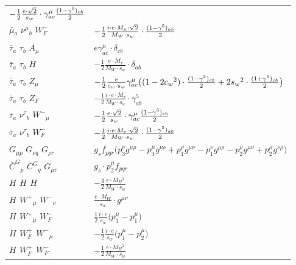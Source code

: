 \begin{center}
\begin{tabular}{|l|l|}
	$-\frac{1}{2}\frac{ e \cdot\sqrt{2}}{ s_w}\cdot \gamma_{a c}^\mu {(1-\gamma^5)_{c b}\over 2} $\\[2mm]
$\bar{\mu}{}_{a }$ \phantom{-} $\nu^\mu{}_{b }$ \phantom{-} $W^-_F{}_{}$ \phantom{-}  &
	$-\frac{1}{2}\frac{ i \cdot e \cdot M_{\mu} \cdot\sqrt{2}}{ M_W \cdot s_w}\cdot {(1-\gamma^5)_{a b}\over 2} $\\[2mm]
$\bar{\tau}{}_{a }$ \phantom{-} $\tau{}_{b }$ \phantom{-} ${A}_{\mu }$ \phantom{-}  &
	$ e\gamma_{a c}^\mu \cdot \delta_{c b} $\\[2mm]
$\bar{\tau}{}_{a }$ \phantom{-} $\tau{}_{b }$ \phantom{-} ${H}_{}$ \phantom{-}  &
	$-\frac{1}{2}\frac{ e \cdot M_{\tau}}{ M_W \cdot s_w}\cdot \delta_{a b} $\\[2mm]
$\bar{\tau}{}_{a }$ \phantom{-} $\tau{}_{b }$ \phantom{-} ${Z}_{\mu }$ \phantom{-}  &
	$-\frac{1}{2}\frac{ e}{ c_w \cdot s_w}\gamma_{a c}^\mu \big( (1-2 c_w {}^2)\cdot {(1-\gamma^5)_{c b}\over 2} +2 s_w{}^2 \cdot {(1+\gamma^5)_{c b}\over 2} \big)$\\[2mm]
$\bar{\tau}{}_{a }$ \phantom{-} $\tau{}_{b }$ \phantom{-} $Z_F{}_{}$ \phantom{-}  &
	$-\frac{1}{2}\frac{ i \cdot e \cdot M_{\tau}}{ M_W \cdot s_w}\cdot \gamma_{a b}^5 $\\[2mm]
$\bar{\tau}{}_{a }$ \phantom{-} $\nu^\tau{}_{b }$ \phantom{-} $W^-{}_{\mu }$ \phantom{-}  &
	$-\frac{1}{2}\frac{ e \cdot\sqrt{2}}{ s_w}\cdot \gamma_{a c}^\mu {(1-\gamma^5)_{c b}\over 2} $\\[2mm]
$\bar{\tau}{}_{a }$ \phantom{-} $\nu^\tau{}_{b }$ \phantom{-} $W^-_F{}_{}$ \phantom{-}  &
	$-\frac{1}{2}\frac{ i \cdot e \cdot M_{\tau} \cdot\sqrt{2}}{ M_W \cdot s_w}\cdot {(1-\gamma^5)_{a b}\over 2} $\\[2mm]
${G}_{\mu p }$ \phantom{-} ${G}_{\nu q }$ \phantom{-} ${G}_{\rho r }$ \phantom{-}  &
	$ g_sf_{p q r} \big(p_3^\nu g^{\mu \rho} -p_3^\mu g^{\nu \rho} +p_1^\rho g^{\mu \nu} -p_1^\nu g^{\mu \rho} -p_2^\rho g^{\mu \nu} +p_2^\mu g^{\nu \rho} \big)$\\[2mm]
$\bar{C}^G{}_{p }$ \phantom{-} $C^G{}_{q }$ \phantom{-} ${G}_{\mu r }$ \phantom{-}  &
	$ g_s\cdot p_2^\mu f_{p q r} $\\[2mm]
${H}_{}$ \phantom{-} ${H}_{}$ \phantom{-} ${H}_{}$ \phantom{-}  &
	$-\frac{3}{2}\frac{ e \cdot M_H{}^2 }{ M_W \cdot s_w}$\\[2mm]
${H}_{}$ \phantom{-} $W^+{}_{\mu }$ \phantom{-} $W^-{}_{\nu }$ \phantom{-}  &
	$\frac{ e \cdot M_W}{ s_w}\cdot g^{\mu \nu} $\\[2mm]
${H}_{}$ \phantom{-} $W^+{}_{\mu }$ \phantom{-} $W^-_F{}_{}$ \phantom{-}  &
	$\frac{1}{2}\frac{ i \cdot e}{ s_w}\big(p_3^\mu -p_1^\mu \big)$\\[2mm]
${H}_{}$ \phantom{-} $W^+_F{}_{}$ \phantom{-} $W^-{}_{\mu }$ \phantom{-}  &
	$-\frac{1}{2}\frac{ i \cdot e}{ s_w}\big(p_1^\mu -p_2^\mu \big)$\\[2mm]
${H}_{}$ \phantom{-} $W^+_F{}_{}$ \phantom{-} $W^-_F{}_{}$ \phantom{-}  &
	$-\frac{1}{2}\frac{ e \cdot M_H{}^2 }{ M_W \cdot s_w}$\\ \hline
\end{tabular}


\end{center}
